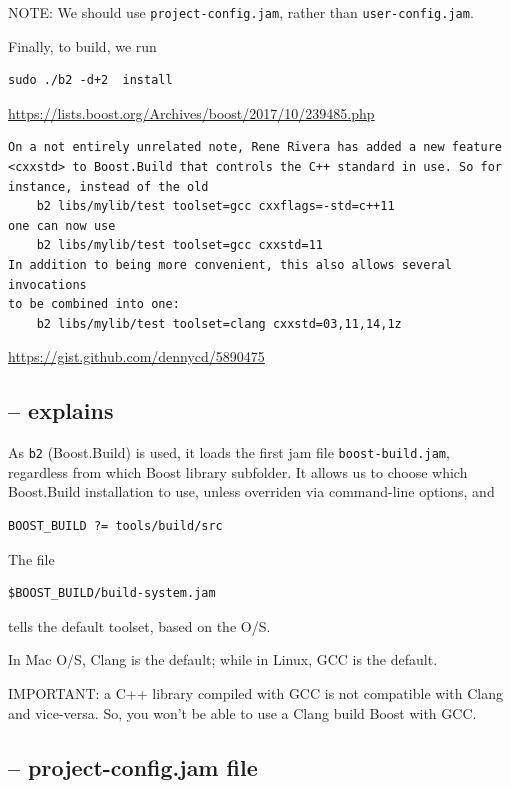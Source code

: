 NOTE: We should use \verb!project-config.jam!, rather than
\verb!user-config.jam!.


Finally, to build, we run
\begin{verbatim}
sudo ./b2 -d+2  install
\end{verbatim}

 \url{https://lists.boost.org/Archives/boost/2017/10/239485.php}
\begin{verbatim}
On a not entirely unrelated note, Rene Rivera has added a new feature 
<cxxstd> to Boost.Build that controls the C++ standard in use. So for 
instance, instead of the old 
    b2 libs/mylib/test toolset=gcc cxxflags=-std=c++11 
one can now use 
    b2 libs/mylib/test toolset=gcc cxxstd=11 
In addition to being more convenient, this also allows several invocations 
to be combined into one: 
    b2 libs/mylib/test toolset=clang cxxstd=03,11,14,1z 
\end{verbatim}
\url{https://gist.github.com/dennycd/5890475}

\subsection{-- explains}

As \verb!b2! (Boost.Build) is used, it loads the first jam file
\verb!boost-build.jam!, regardless from which Boost library subfolder. It allows us to choose 
which Boost.Build installation to use, unless overriden via command-line options, and
\begin{verbatim}
BOOST_BUILD ?= tools/build/src
\end{verbatim}
The file 
\begin{verbatim}
$BOOST_BUILD/build-system.jam
\end{verbatim}
tells the default toolset, based on the O/S.

In Mac O/S, Clang is the default; while in Linux, GCC is the default. 


IMPORTANT: a C++ library compiled with GCC is not compatible with Clang and
vice-versa. So, you won’t be able to use a Clang build Boost with GCC.
 
\subsection{-- project-config.jam file}

